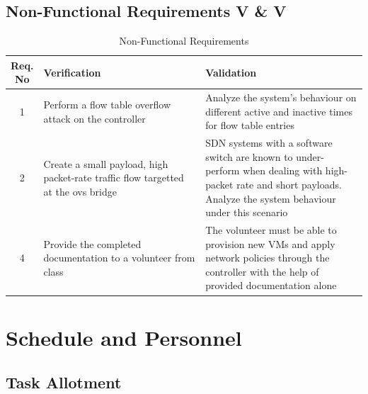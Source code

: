 \documentclass[12pt]{extarticle}
\begin{document}
\begin{center}
\begin{table}[H]
\subsection{Non-Functional Requirements V \& V}
\begin{tabular}{||c  | p{0.5\linewidth} | p{0.5\linewidth} ||}
     \hline
     Req. No & Verification & Validation  \\ 
     \hline \hline
     1 & Perform a flow table overflow attack on the controller & Analyze the system's behaviour on different active and inactive times for flow table entries \\
     \hline
     2 & Create a small payload, high packet-rate traffic flow targetted at the ovs bridge & SDN systems with a software switch are known to under-perform when dealing with high-packet rate and short payloads. Analyze the system behaviour under this scenario \\
     \hline
     4 & Provide the completed documentation to a volunteer from class & The volunteer must be able to provision new VMs and apply network policies through the controller with the help of provided documentation alone \\     
    \hline
\end{tabular}
\caption{Non-Functional Requirements}
\label{table:nonfunc_vv}
\end{table}
\end{center}

\section{Schedule and Personnel}

\subsection{Task Allotment}
\end{document}

